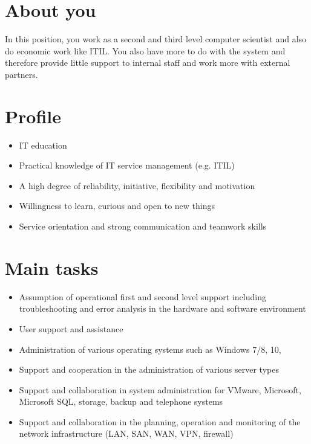 \section*{About you}

In this position, you work as a second and third level computer scientist and also do economic work like ITIL.
You also have more to do with the system and therefore provide little support to internal staff and work more with external partners.

\section*{Profile}

\begin{itemize}
    \item IT education
    \item Practical knowledge of IT service management (e.g. ITIL)
    \item A high degree of reliability, initiative, flexibility and motivation
    \item Willingness to learn, curious and open to new things
    \item Service orientation and strong communication and teamwork skills
\end{itemize}

\section*{Main tasks}

\begin{itemize}
    \item Assumption of operational first and second level support including troubleshooting and error analysis in the hardware and software environment
    \item User support and assistance
    \item Administration of various operating systems such as Windows 7/8, 10,
    \item Support and cooperation in the administration of various server types
    \item Support and collaboration in system administration for VMware, Microsoft, Microsoft SQL, storage, backup and telephone systems
    \item Support and collaboration in the planning, operation and monitoring of the network infrastructure (LAN, SAN, WAN, VPN, firewall)
\end{itemize}